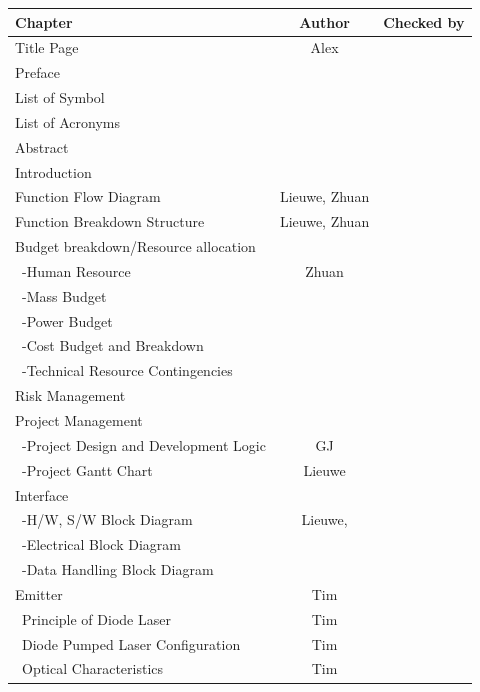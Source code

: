 \begin{table}[ht!]
\centering
\begin{tabular}{|l|c|c|}
\hline
 Chapter                              & Author & Checked by \\\hline 
 Title Page                           & Alex   & \\\hline                  
 Preface                              &\\\hline
 List of Symbol                       &\\\hline
 List of Acronyms                     &\\\hline
 Abstract                             &\\\hline
 Introduction                         &\\\hline
 Function Flow Diagram                & Lieuwe, Zhuan & \\\hline
 Function Breakdown Structure         & Lieuwe, Zhuan &\\\hline
 Budget breakdown/Resource allocation &\\\hline
 \ -Human Resource                    & Zhuan &\\\hline
 \ -Mass Budget                       &\\\hline
 \ -Power Budget                      &\\\hline
 \ -Cost Budget and Breakdown         &\\\hline
 \ -Technical Resource Contingencies  &\\\hline
 Risk Management                      &\\\hline
 Project Management                   &\\\hline
 \ -Project Design and Development Logic & GJ &\\\hline
 \ -Project Gantt Chart               & Lieuwe &\\\hline
 Interface                            &\\\hline
 \ -H/W, S/W Block Diagram            & Lieuwe, &\\\hline
 \ -Electrical Block Diagram          &\\\hline
 \ -Data Handling Block Diagram       &\\\hline
 Emitter                              & Tim &\\\hline
 \ Principle of Diode Laser           & Tim &\\\hline
 \ Diode Pumped Laser Configuration   & Tim &\\\hline
 \ Optical Characteristics            & Tim &\\\hline

\end{tabular}
\end{table}
